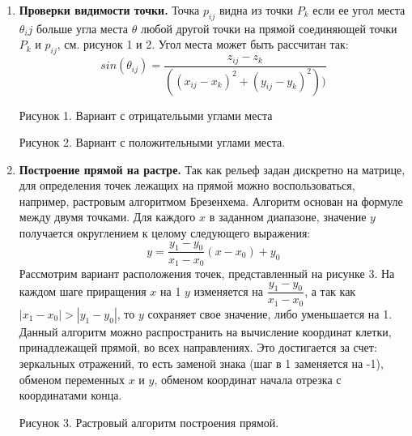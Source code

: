 \begin{enumerate}
    \item \textbf{Проверки видимости точки.}
    Точка $p_{ij}$ видна из точки $P_k$ если ее угол места $\theta_ij$ больше угла места $\theta$ любой другой точки на прямой соединяющей точки $P_k$ и $p_{ij}$, см. рисунок 1 и 2. Угол места может быть рассчитан так:
    $$sin(\theta_{ij} )=\frac{z_{ij}-z_k}{((x_{ij}-x_k )^2+(y_{ij}-y_k )^2 ) )}$$


    \begin{center}
        Рисунок 1. Вариант с отрицательыми углами места
    \end{center}


    \begin{center}
        Рисунок 2. Вариант с положительными углами места.
    \end{center}

    \item \textbf{Построение прямой на растре.}
    Так как рельеф задан дискретно на матрице, для определения точек лежащих на прямой можно воспользоваться, например, растровым алгоритмом Брезенхема. Алгоритм основан на формуле между двумя точками. Для каждого $x$ в заданном диапазоне, значение $y$ получается округлением к целому следующего выражения: $$y=\frac{y_1-y_0}{x_1-x_0} (x-x_0 )+y_0$$
    Рассмотрим вариант расположения точек, представленный на рисунке 3. На каждом шаге приращения $x$ на 1 $y$ изменяется на $\dfrac{y_1-y_0}{x_1-x_0}$, а так как \linebreak $|x_1-x_0 |>|y_1-y_0 |$, то $y$ сохраняет свое значение, либо уменьшается на 1. Данный алгоритм можно распространить на вычисление координат клетки, принадлежащей прямой, во всех направлениях. Это достигается за счет: зеркальных отражений, то есть заменой знака (шаг в 1 заменяется на -1), обменом переменных $x$ и $y$, обменом координат начала отрезка с координатами конца.


    \begin{center}
        Рисунок 3. Растровый алгоритм построения прямой.
    \end{center}


\end{enumerate}
